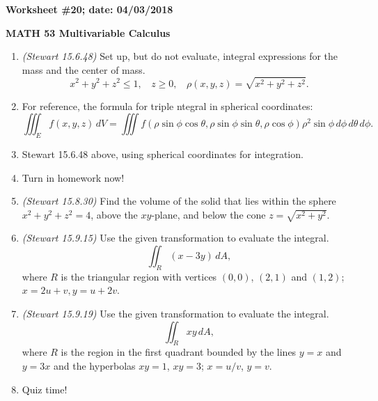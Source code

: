 \documentclass{article}
\begin{document}
{\bf Worksheet \#20; date: 04/03/2018}

{\bf MATH 53 Multivariable Calculus}

\begin{enumerate}
\item {\em (Stewart 15.6.48)} Set up, but do not evaluate, integral expressions for the mass and the center of mass.
\[
x^2 + y^2 + z^2 \le 1, ~~~~ z \ge 0, ~~~~ \rho(x, y, z) = \sqrt{x^2 + y^2 + z^2}.
\]

\item For reference, the formula for triple ntegral in spherical coordinates:
\[
\iiint_E f(x, y, z) \,dV = \iiint f(\rho \sin \phi \cos \theta, \rho \sin \phi \sin \theta, \rho \cos \phi) \rho^2 \sin \phi \,d\phi \,d\theta \,d\phi.
\]

\item Stewart 15.6.48 above, using spherical coordinates for integration.

\item Turn in homework now!

\item {\em (Stewart 15.8.30)} Find the volume of the solid that lies within the sphere $x^2 + y^2 + z^2 = 4$, above the $xy$-plane, and below the cone $z = \sqrt{x^2 + y^2}$.

\item {\em (Stewart 15.9.15)} Use the given transformation to evaluate the integral.
\[
\iint_R (x - 3y) \,dA,
\]
where $R$ is the triangular region with vertices $(0, 0)$, $(2, 1)$ and $(1, 2)$; $x = 2u + v, y = u + 2v$.

\item {\em (Stewart 15.9.19)} Use the given transformation to evaluate the integral.
\[
\iint_R xy \,dA,
\]
where $R$ is the region in the first quadrant bounded by the lines $y = x$ and $y = 3x$ and the hyperbolas $xy = 1$, $xy = 3$; $x = u/v$, $y = v$.

\item Quiz time!
\end{enumerate}
\end{document}
